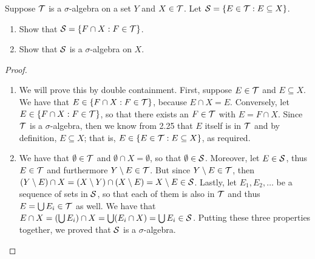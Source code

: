 \begin{exercise}{11}
Suppose $\mathcal{T}$ is a $\sigma$-algebra on a set $Y$ and $X \in \mathcal{T}$.
Let $\mathcal{S} = \{E\in\mathcal{T} : E \subseteq X\}$.
\begin{enumerate}
    \item Show that $\mathcal{S} = \{F\cap X : F\in\mathcal{T}\}$.
    \item Show that $\mathcal{S}$ is a $\sigma$-algebra on $X$.
\end{enumerate}
\end{exercise}
\begin{proof}
\begin{enumerate}
    \item We will prove this by double containment.
    First, suppose $E \in \mathcal{T}$ and $E \subseteq X$.
    We have that $E \in \{F\cap X: F\in\mathcal{T}\}$, because $E\cap X= E$.
    Conversely, let $E \in \{F\cap X : F\in\mathcal{T}\}$, so that there exists an $F \in \mathcal{T}$ with $E = F\cap X$.
    Since $\mathcal{T}$ is a $\sigma$-algebra, then we know from 2.25 that $E$ itself is in $\mathcal{T}$ and by definition, $E \subseteq X$;
    that is, $E \in \{E\in\mathcal{T} : E \subseteq X\}$, as required.
    \item We have that $\emptyset \in \mathcal{T}$ and $\emptyset \cap X =\emptyset $, so that $\emptyset \in \mathcal{S}$.
    Moreover, let $E \in \mathcal{S}$, thus $E \in \mathcal{T}$ and furthermore $Y \setminus E \in \mathcal{T}$.
    But since $Y \setminus E \in \mathcal{T}$, then $(Y \setminus E) \cap X = (X \setminus Y) \cap (X \setminus E) = X \setminus E \in \mathcal{S}$.
    Lastly, let $E_1,E_2,\dots$ be a sequence of sets in $\mathcal{S}$, so that each of them is also in $\mathcal{T}$ and thus $E = \bigcup E_i \in \mathcal{T}$ as well.
    We have that $E \cap X = (\bigcup E_i) \cap X = \bigcup (E_i \cap X) =\bigcup E_i \in \mathcal{S}$.
    Putting these three properties together, we proved that $\mathcal{S}$ is a $\sigma$-algebra.
\end{enumerate}
\end{proof} 


